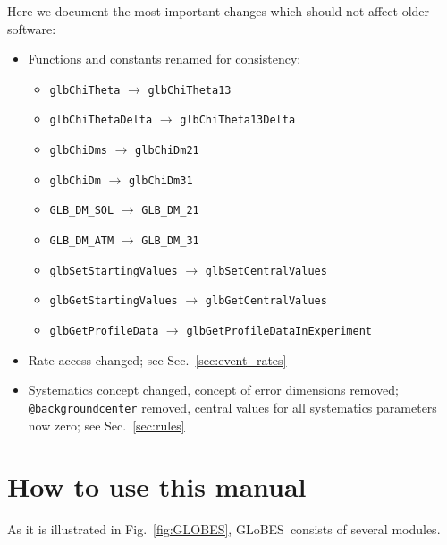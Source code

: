 \documentclass[a4paper,12pt,twoside]{book}
\newcommand{\fig}{Fig.}
\newcommand{\Sec}{Sec.}
\newcommand{\GLOBES}{{\sf GLoBES}}
\newcommand{\figu}[1]{\fig~\ref{fig:#1}}
\begin{document}
Here we document the most important changes which should not affect older software:
\begin{itemize}
\item
 Functions and constants renamed for consistency:
\begin{itemize}
\item
 {\tt glbChiTheta} $\rightarrow$ {\tt glbChiTheta13}
\item
 {\tt glbChiThetaDelta} $\rightarrow$ {\tt glbChiTheta13Delta}
\item
 {\tt glbChiDms} $\rightarrow$ {\tt glbChiDm21}
\item
 {\tt glbChiDm} $\rightarrow$ {\tt glbChiDm31}
\item
 {\tt GLB\_DM\_SOL} $\rightarrow$ {\tt GLB\_DM\_21}
\item
 {\tt GLB\_DM\_ATM} $\rightarrow$ {\tt GLB\_DM\_31}
\item
 {\tt glbSetStartingValues} $\rightarrow$ {\tt glbSetCentralValues}
\item
 {\tt glbGetStartingValues} $\rightarrow$ {\tt glbGetCentralValues}
\item
 {\tt glbGetProfileData} $\rightarrow$ {\tt glbGetProfileDataInExperiment}
\end{itemize}
\item
 Rate access changed; see \Sec~\ref{sec:event_rates}
\item
 Systematics concept changed, concept of error dimensions removed; {\tt @backgroundcenter} removed, central values for all systematics parameters
now zero; see \Sec~\ref{sec:rules}
\end{itemize}

\cleardoublepage
\tableofcontents

\cleardoublepage
\setcounter{page}{1}

\chapter*{How to use this manual}

As it is illustrated in \figu{GLOBES}, \GLOBES\ consists 
of several modules.
\end{document}
